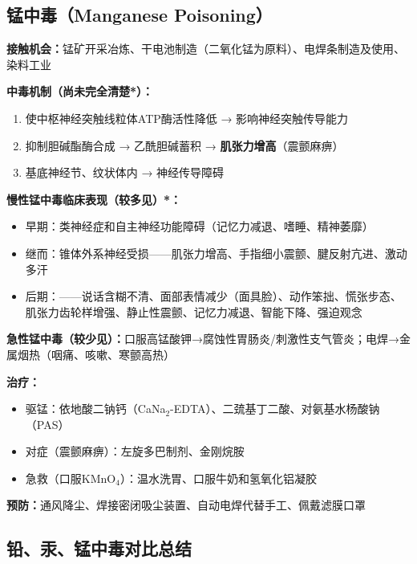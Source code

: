 \subsection{锰中毒（Manganese Poisoning）}

\begin{keybox}
\textbf{接触机会：}锰矿开采冶炼、干电池制造（二氧化锰为原料）、电焊条制造及使用、染料工业

\textbf{中毒机制（尚未完全清楚*）：}
\begin{enumerate}[leftmargin=*]
    \item 使中枢神经突触线粒体ATP酶活性降低 → 影响神经突触传导能力
    \item 抑制胆碱酯酶合成 → 乙酰胆碱蓄积 → \textbf{肌张力增高}（震颤麻痹）
    \item 基底神经节、纹状体内 → 神经传导障碍
\end{enumerate}

\textbf{慢性锰中毒临床表现（较多见）*：}
\begin{itemize}[leftmargin=*]
    \item 早期：类神经症和自主神经功能障碍（记忆力减退、嗜睡、精神萎靡）
    \item 继而：锥体外系神经受损——肌张力增高、手指细小震颤、腱反射亢进、激动多汗
    \item 后期：——说话含糊不清、面部表情减少（面具脸）、动作笨拙、慌张步态、肌张力齿轮样增强、静止性震颤、记忆力减退、智能下降、强迫观念
\end{itemize}

\textbf{急性锰中毒（较少见）：}口服高锰酸钾→腐蚀性胃肠炎/刺激性支气管炎；电焊→金属烟热（咽痛、咳嗽、寒颤高热）

\textbf{治疗：}
\begin{itemize}[leftmargin=*]
    \item 驱锰：依地酸二钠钙（CaNa$_2$-EDTA）、二巯基丁二酸、对氨基水杨酸钠（PAS）
    \item 对症（震颤麻痹）：左旋多巴制剂、金刚烷胺
    \item 急救（口服KMnO$_4$）：温水洗胃、口服牛奶和氢氧化铝凝胶
\end{itemize}

\textbf{预防：}通风降尘、焊接密闭吸尘装置、自动电焊代替手工、佩戴滤膜口罩
\end{keybox}

\subsection{铅、汞、锰中毒对比总结}

